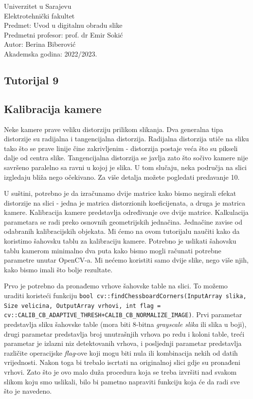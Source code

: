\documentclass[a4paper, 12pt]{article}
\begin{document}
\noindent
Univerzitet u Sarajevu\\
Elektrotehnički fakultet\\
Predmet: Uvod u digitalnu obradu slike\\
Predmetni profesor: prof. dr Emir Sokić\\
Autor: Berina Biberović\\
Akademska godina: 2022/2023.


\begin{center}
    \section*{Tutorijal 9}
    \subsection*{Kalibracija kamere}
\end{center}



Neke kamere prave veliku distorziju prilikom slikanja. Dva generalna tipa distorzije su radijalna i tangencijalna distorzija. Radijalna distorzija utiče na sliku tako što se prave linije čine zakrivljenim - distorzija postaje veća što su pikseli dalje od centra slike. Tangencijalna distorzija se javlja zato što sočivo kamere nije savršeno paralelno sa ravni u kojoj je slika. U tom slučaju, neka područja na slici izgledaju bliža nego očekivano. Za više detalja možete pogledati predavanje 10.

U suštini, potrebno je da izračunamo dvije matrice kako bismo negirali efekat distorzije na slici - jedna je matrica distorzionih koeficijenata, a druga je matrica kamere. Kalibracija kamere predstavlja određivanje ove dvije matrice. Kalkulacija parametara se radi preko osnovnih geometrijskih jednačina. Jednačine zavise od odabranih kalibracijskih objekata. Mi ćemo na ovom tutorijalu naučiti kako da koristimo šahovsku tablu za kalibraciju kamere. Potrebno je uslikati šahovsku tablu kamerom minimalno dva puta kako bismo mogli računati potrebne parametre unutar OpenCV-a. Mi nećemo koristiti samo dvije slike, nego više njih, kako bismo imali što bolje rezultate.

Prvo je potrebno da pronađemo vrhove šahovske table na slici. To možemo uraditi koristeći funkciju \lstinline{bool cv::findChessboardCorners(InputArray slika, Size velicina, OutputArray vrhovi, int flag = cv::CALIB_CB_ADAPTIVE_THRESH+CALIB_CB_NORMALIZE_IMAGE)}. Prvi parametar predstavlja sliku šahovske table (mora biti 8-bitna \textit{grayscale slika} ili slika u boji), drugi parametar predstavlja broj unutrašnjih vrhova po redu i koloni table, treći parametar je izlazni niz detektovanih vrhova, i posljednji parametar predstavlja različite operacijske \textit{flag}-ove koji mogu biti nula ili kombinacija nekih od datih vrijednosti. Nakon toga bi trebalo iscrtati na originalnoj slici gdje su pronađeni vrhovi. Zato što je ovo malo duža procedura koja se treba izvršiti nad svakom slikom koju smo uslikali, bilo bi pametno napraviti funkciju koja će da radi sve što je navedeno.
\end{document}
